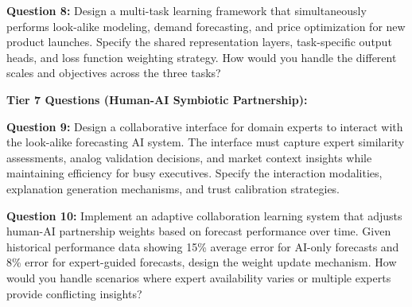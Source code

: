 \documentclass{article}
\begin{document}
\textbf{Question 8:} Design a multi-task learning framework that simultaneously performs look-alike modeling, demand forecasting, and price optimization for new product launches. Specify the shared representation layers, task-specific output heads, and loss function weighting strategy. How would you handle the different scales and objectives across the three tasks?

\textbf{Tier 7 Questions (Human-AI Symbiotic Partnership):}

\textbf{Question 9:} Design a collaborative interface for domain experts to interact with the look-alike forecasting AI system. The interface must capture expert similarity assessments, analog validation decisions, and market context insights while maintaining efficiency for busy executives. Specify the interaction modalities, explanation generation mechanisms, and trust calibration strategies.

\textbf{Question 10:} Implement an adaptive collaboration learning system that adjusts human-AI partnership weights based on forecast performance over time. Given historical performance data showing 15\% average error for AI-only forecasts and 8\% error for expert-guided forecasts, design the weight update mechanism. How would you handle scenarios where expert availability varies or multiple experts provide conflicting insights?
\end{document}
